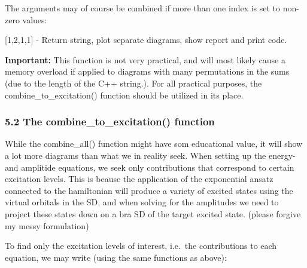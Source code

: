 \documentclass[letterpaper,10pt,english]{/Users/kinealicegulbrandsen/anaconda/lib/python2.7/site-packages/sphinx/texinputs/sphinxhowto}
\begin{document}
The arguments may of course be combined if more than one index is set to
non-zero values:

{[}1,2,1,1{]} - Return string, plot separate diagrams, show report and
print code.

\textbf{Important:} This function is not very practical, and will most
likely cause a memory overload if applied to diagrams with many
permutations in the sums (due to the length of the C++ string.). For all
practical purposes, the combine\_to\_excitation() function should be
utilized in its place.\subsubsection{5.2 The combine\_to\_excitation()
function}\label{the-combineux5ftoux5fexcitation-function}

While the combine\_all() function might have som educational value, it
will show a lot more diagrams than what we in reality seek. When setting
up the energy- and amplitide equations, we seek only contributions that
correspond to certain excitation levels. This is beause the application
of the exponential ansatz connected to the hamiltonian will produce a
variety of excited states using the virtual orbitals in the SD, and when
solving for the amplitudes we need to project these states down on a bra
SD of the target excited state. (please forgive my messy formulation)

To find only the excitation levels of interest, i.e.~the contributions
to each equation, we may write (using the same functions as above):

\end{document}
